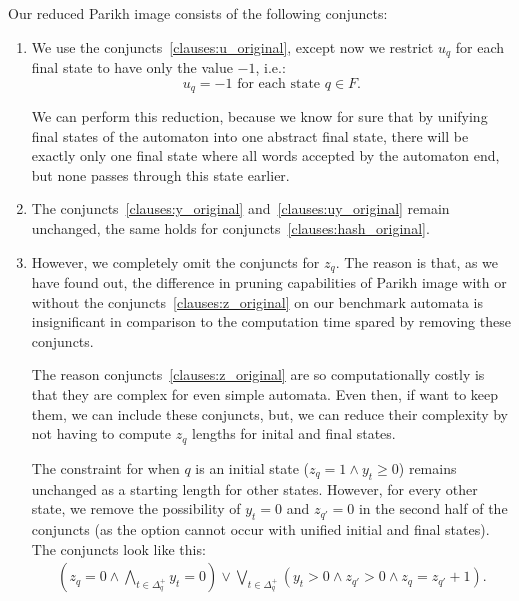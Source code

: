 Our reduced Parikh image consists of the following conjuncts:
\begin{enumerate}
    \item \label{clauses:u_reduced} We use the conjuncts~\ref{clauses:u_original}, except now we restrict $u_q$ for each final state to have only the value $-1$, i.e.:
    $$ u_{q} = -1 \text{ for each state } q \in F \text{.}$$

    We can perform this reduction, because we know for sure that by unifying final states of the automaton into one abstract final state, there will be exactly only one final state where all words accepted by the automaton end, but none passes through this state earlier.

    \item \label{clauses:y_reduced} \label{clauses:uy_reduced} \label{clauses:hash_reduced} The conjuncts~\ref{clauses:y_original} and~\ref{clauses:uy_original} remain unchanged, the same holds for conjuncts~\ref{clauses:hash_original}.

    \item \label{clauses:z_reduced} However, we completely omit the conjuncts for $z_{q}$. The reason is that, as we have found out, the difference in pruning capabilities of Parikh image with or without the conjuncts~\ref{clauses:z_original} on our benchmark automata is insignificant in comparison to the computation time spared by removing these conjuncts.

    The reason conjuncts~\ref{clauses:z_original} are so computationally costly is that they are complex for even simple automata. Even then, if want to keep them, we can include these conjuncts, but, we can reduce their complexity by not having to compute $z_q$ lengths for inital and final states.

    The constraint for when $q$ is an initial state ($z_q = 1 \land y_t \geq 0$) remains unchanged as a starting length for other states. However, for every other state, we remove the possibility of $y_t = 0$ and $z_{q'} = 0$ in the second half of the conjuncts (as the option cannot occur with unified initial and final states). The conjuncts look like this:
    {
    \begin{align*}
		(z_q = 0 \land \bigwedge_{t \in \Delta_q^+} y_t = 0) \lor \bigvee_{t \in \Delta_q^+} (y_t > 0 \land z_{q'} > 0 \land z_q = z_{q'} + 1) \text{.}
    \end{align*}
    }

\end{enumerate}


